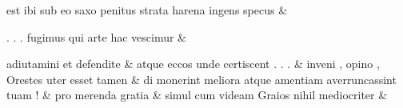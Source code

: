 \documentclass[12pt,onecolumn,twoside,a4paper]{memoir}
\begin{document}
\begin{pairs}
\begin{Leftside}
                              est
                              ibi
                              sub
                              eo
                              saxo
                              penitus
                              strata
                              harena
                              ingens
                              specus \&
                         \stanza {}
                     
                              .
                              .
                              .
                              fugimus
                              qui
                              arte
                              hac
                              vescimur \&
                         \stanza {}
                     
                              adiutamini
                              et
                              defendite \&
                         \stanza {}
                     atque
                              eccos
                              unde
                              certiscent
                              .
                              .
                              . \&
                         \stanza {}
                     inveni
                              ,
                              opino
                              ,
                              Orestes
                              uter
                              esset
                              tamen \&
                         \stanza {}
                     di
                              monerint
                              meliora
                              atque
                              amentiam
                              averruncassint
                              tuam
                              ! \&
                         \stanza {}pro
                              merenda
                              gratia & simul
                              cum
                              videam
                              Graios
                              nihil
                              mediocriter & 
                     

\end{Leftside}
\end{pairs}
\end{document}
